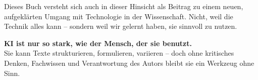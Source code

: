 Dieses Buch versteht sich auch in dieser Hinsicht als Beitrag zu einem neuen, aufgeklärten Umgang mit Technologie in der Wissenschaft. Nicht, weil die Technik alles kann – sondern weil wir gelernt haben, sie sinnvoll zu nutzen.

\medskip
\begin{tcolorbox}[didaktikbox, title=Leitgedanke]
	\label{box:leitgedanke}
	\small
	\textbf{KI ist nur so stark, wie der Mensch, der sie benutzt.}\\
	Sie kann Texte strukturieren, formulieren, variieren – 
	doch ohne kritisches Denken, Fachwissen und Verantwortung 
	des Autors bleibt sie ein Werkzeug ohne Sinn.
\end{tcolorbox}
